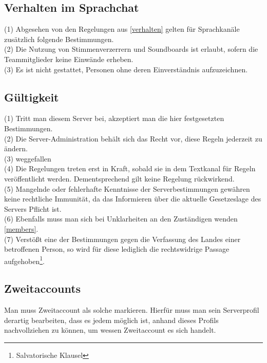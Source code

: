 \documentclass{article}
\begin{document}
\subsection{Verhalten im Sprachchat}
(1) Abgesehen von den Regelungen aus \ref{verhalten} gelten für Sprachkanäle zusätzlich folgende Bestimmungen.\\
(2) Die Nutzung von Stimmenverzerrern und Soundboards ist erlaubt, sofern die Teammitglieder keine Einwände erheben.\\
(3) Es ist nicht gestattet, Personen ohne deren Einverständnis aufzuzeichnen.

\subsection{Gültigkeit}
(1) Tritt man diesem Server bei, akzeptiert man die hier festgesetzten Bestimmungen.\\
(2) Die Server-Administration behält sich das Recht vor, diese Regeln jederzeit zu ändern.\\
(3) weggefallen\\
(4) Die Regelungen treten erst in Kraft, sobald sie in dem Textkanal für Regeln veröffentlicht werden. Dementsprechend gilt keine Regelung rückwirkend.\\
(5) Mangelnde oder fehlerhafte Kenntnisse der Serverbestimmungen gewähren keine rechtliche Immunität, da das Informieren über die aktuelle Gesetzeslage des Servers Pflicht ist.\\
(6) Ebenfalls muss man sich bei Unklarheiten an den Zuständigen wenden \ref{members}.\\
(7) Verstößt eine der Bestimmungen gegen die Verfassung des Landes einer betroffenen Person, so wird für diese lediglich die rechtswidrige Passage aufgehoben\footnote{Salvatorische Klausel}.

\subsection{Zweitaccounts}
Man muss Zweitaccount als solche markieren. Hierfür muss man sein Serverprofil derartig bearbeiten, dass es jedem möglich ist, anhand dieses Profils nachvollziehen zu können, um wessen Zweitaccount es sich handelt.
\end{document}
